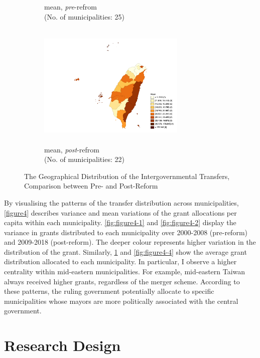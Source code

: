 \begin{figure}
\begin{subfigure}[t]{0.48\textwidth}
    \caption{mean, \textit{pre}-refrom\\ (No. of municipalities: 25)} 
    \label{fig:figure4-3}
    \end{subfigure}    
    \centering
    \begin{subfigure}[t]{0.48\textwidth}
    \includegraphics[width=7cm, height=6cm]{04-Chapter-Four/image/figure4-4.png}
    \caption{mean, \textit{post}-refrom \\ (No. of municipalities: 22)} 
    \label{fig:figure4-4}
    \end{subfigure}
    \caption{The Geographical Distribution of the Intergovernmental Transfers, Comparison between Pre- and Post-Reform}\label{figure4} 
\end{figure}

By visualising the patterns of the transfer distribution across municipalities, \autoref{figure4} describes variance and mean variations of the grant allocations per capita within each municipality. \autoref{fig:figure4-1} and \ref{fig:figure4-2} display the variance in grants distributed to each municipality over 2000-2008 (pre-reform) and 2009-2018 (post-reform). The deeper colour represents higher variation in the distribution of the grant. Similarly, \ref{fig:figure4-3} and \autoref{fig:figure4-4} show the average grant distribution allocated to each municipality. In particular, I observe a higher centrality within mid-eastern municipalities. For example, mid-eastern Taiwan always received higher grants, regardless of the merger scheme. According to these patterns, the ruling government potentially allocate to specific municipalities whose mayors are more politically associated with the central government. 

\section*{\centering Research Design}

